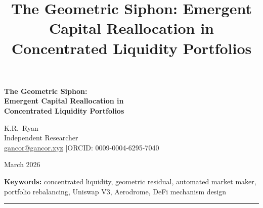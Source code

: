 \documentclass[11pt,a4paper]{article}
\title{The Geometric Siphon: Emergent Capital Reallocation in Concentrated Liquidity Portfolios}
\begin{document}
\thispagestyle{plain}

\begin{center}
{\LARGE\bfseries The Geometric Siphon:\\[4pt]
Emergent Capital Reallocation in\\Concentrated Liquidity Portfolios}

\vspace{12pt}
{\large K.R.\ Ryan}\\[4pt]
{\small Independent Researcher}\\[2pt]
{\small \href{mailto:gancor@gancor.xyz}{gancor@gancor.xyz} \quad|\quad ORCID: 0009-0004-6295-7040}

\vspace{8pt}
March 2026

\vspace{6pt}
{\small\textbf{Keywords:} concentrated liquidity, geometric residual, automated market maker,\\
portfolio rebalancing, Uniswap V3, Aerodrome, DeFi mechanism design}
\end{center}

\vspace{8pt}
\hrule
\vspace{12pt}
\end{document}
